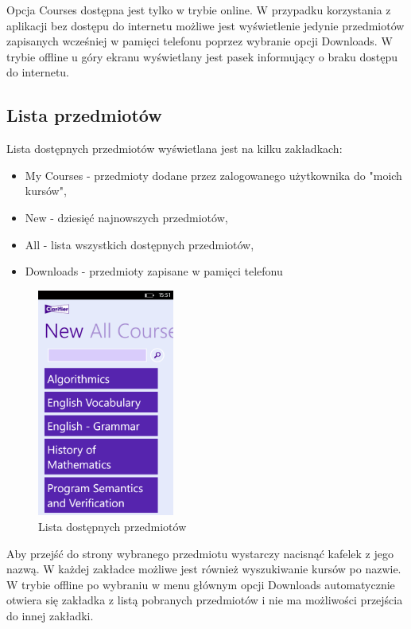 \documentclass{pracamgr}
\begin{document}
Opcja Courses dostępna jest tylko w trybie online. W przypadku korzystania z aplikacji bez dostępu do internetu możliwe jest wyświetlenie jedynie przedmiotów zapisanych wcześniej w pamięci telefonu poprzez wybranie opcji Downloads. W trybie offline u góry ekranu wyświetlany jest pasek informujący o braku dostępu do internetu.

\subsection{Lista przedmiotów}
Lista dostępnych przedmiotów wyświetlana jest na kilku zakładkach: 
\begin{itemize}
\item My Courses - przedmioty dodane przez zalogowanego użytkownika do "moich kursów",
\item New - dziesięć najnowszych przedmiotów,
\item All - lista wszystkich dostępnych przedmiotów,
\item Downloads - przedmioty zapisane w pamięci telefonu
\end{itemize}

\begin{figure}[h]
    \centering
    \includegraphics[width=0.4\textwidth]{Courses.png}
    \caption{Lista dostępnych przedmiotów}
    \label{fig:courses}
\end{figure}

Aby przejść do strony wybranego przedmiotu wystarczy nacisnąć kafelek z jego nazwą. W każdej zakładce możliwe jest również wyszukiwanie kursów po nazwie. W trybie offline po wybraniu w menu głównym opcji Downloads automatycznie otwiera się zakładka z listą pobranych przedmiotów i nie ma możliwości przejścia do innej zakładki. 
\end{document}

